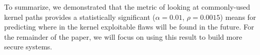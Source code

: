 To summarize, we demonstrated that the metric of looking at commonly-used
kernel paths provides a statistically significant ($\alpha=0.01$,
$\rho=0.0015$) means for predicting where in the kernel exploitable flaws
will be found in the future.  For the remainder of the paper, we will
focus on using this result to build more secure systems.










%

